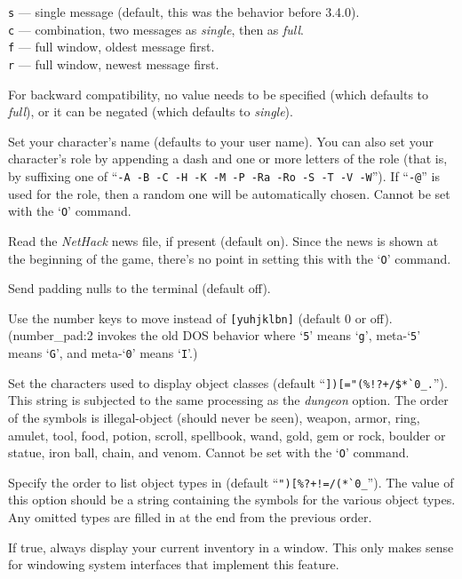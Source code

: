 {\tt s} --- single message (default, this was the behavior before 3.4.0).\\
{\tt c} --- combination, two messages as {\it single\/}, then as {\it full\/}.\\
{\tt f} --- full window, oldest message first.\\
{\tt r} --- full window, newest message first.

For backward compatibility, no value needs to be specified (which
defaults to {\it full\/}), or it can be negated (which defaults
to {\it single\/}). 
\item[\ib{name}]
Set your character's name (defaults to your user name).  You can also
set your character's role by appending a dash and one or more letters of
the role (that is, by suffixing one of
``{\tt -A -B -C -H -K -M -P -Ra -Ro -S -T -V -W}'').
If ``{\tt -@}'' is used for the role, then a random one will be
automatically chosen.
Cannot be set with the `{\tt O}' command.
\item[\ib{news}]
Read the {\it NetHack\/} news file, if present (default on).
Since the news is shown at the beginning of the game, there's no point
in setting this with the `{\tt O}' command.
\item[\ib{null}]
Send padding nulls to the terminal (default off).
\item[\ib{number\_pad}]
Use the number keys to move instead of {\tt [yuhjklbn]} (default 0 or off).
(number\_pad:2 invokes the old DOS behavior where `{\tt 5}' means `{\tt g}', 
meta-`{\tt 5}' means `{\tt G}',  and meta-`{\tt 0}' means `{\tt I}'.)
\item[\ib{objects}]
Set the characters used to display object classes (default
``\verb&])[="(%!?+/$*`0_.&'').
This string is subjected to the same processing as the {\it dungeon\/} option.
The order of the symbols is
illegal-object (should never be seen), weapon, armor, ring, amulet, tool,
food, potion, scroll, spellbook, wand, gold, gem or rock, boulder or statue,
iron ball, chain, and venom.
Cannot be set with the `{\tt O}' command.
\item[\ib{packorder}]
Specify the order to list object types in (default
``\verb&")[%?+!=/(*`0_&''). The value of this option should be a string
containing the symbols for the various object types.  Any omitted types
are filled in at the end from the previous order.
\item[\ib{perm\_invent}]
If true, always display your current inventory in a window.  This only
makes sense for windowing system interfaces that implement this feature.
